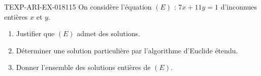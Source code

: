 \begin{exercice}{TEXP-ARI-EX-018}{1}{15}
On considère l'équation $(E)$ : $7x+11y=1$ d'inconnues entières $x$ et $y$.
\begin{enumerate}
  \item Justifier que $(E)$ admet des solutions.
  \item Déterminer une solution particulière par l'algorithme d'Euclide
        étendu.
  \item Donner l'ensemble des solutions entières de $(E)$.
\end{enumerate}
\end{exercice}
